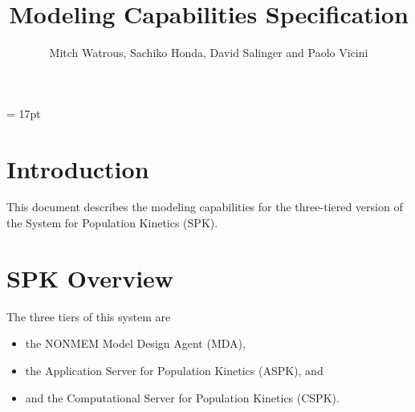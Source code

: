 \documentclass{article}
\begin{document}
\large
\baselineskip = 17pt

\newcommand{\R}{\mbox{\bf R}}
\newcommand{\Z}{\mbox{\bf Z}}
\newcommand{\N}{\mbox{\bf N}}
\newcommand{\E}{\mbox{\bf E}}
\newcommand{\V}{\mbox{\bf V}}
\newcommand{\Th}[1]{$#1$th}
\newcommand{\BS}{$\backslash$}
\newcommand{\Arg}[1]{\bigskip \noindent $#1$ \linebreak}
\newcommand{\TT}[1]{\bigskip \noindent {\tt #1 } \linebreak}
\newcommand{\rvec}{\mbox{rvec}}


%
%


\title{Modeling Capabilities Specification}

\author{Mitch Watrous, Sachiko Honda, David Salinger and Paolo Vicini}

\maketitle



\tableofcontents

\newpage


%
\section{Introduction}
%

This document describes the modeling capabilities for the 
three-tiered version of the System for Population Kinetics (SPK).


%
\section{SPK Overview}
%

The three tiers of this system are
\begin{itemize}
  \item the NONMEM Model Design Agent (MDA),
  \item the Application Server for Population Kinetics (ASPK), and
  \item and the Computational Server for Population Kinetics (CSPK).
\end{itemize}
\end{document}
